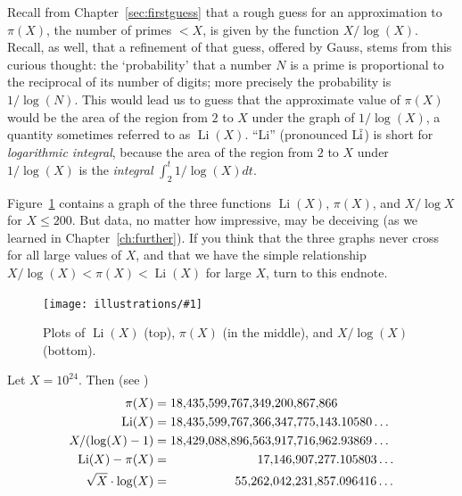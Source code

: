 \documentclass[openany]{book}
\DeclareMathOperator{\Li}{Li}
\newcommand{\ill}[3]{%
   \begin{figure}[H]%
   \vspace{-2ex}
   \centering%
   \texttt{[image: illustrations/\#1]}%
   \caption{#3}%
   \vspace{-2ex}
    \end{figure}}
\theoremstyle{plain}
\theoremstyle{definition}
\begin{document}
Recall from Chapter~\ref{sec:firstguess} that a rough guess for an approximation to
$\pi(X)$, the number of primes $< X$, is given by the function
$X/\log(X)$. Recall, as well, that a refinement of that guess, offered by Gauss, stems from this curious thought:  the `probability' that a number $N$ is a prime  is proportional to the reciprocal of its number of digits; more precisely the probability is $1/\log(N)$.  This would lead us to  guess that the approximate value of $\pi(X)$ would be
the area of the region from $2$ to $X$ under the graph of
$1/\log(X)$, a quantity sometimes referred to as $\Li(X)$.
``Li'' (pronounced L$\overline{\rm i}$) is short for {\em logarithmic integral},
because the area of the region from $2$ to $X$ under $1/\log(X)$
is the {\em integral} $\int_2^t 1/\log(X) dt$.




Figure~\ref{fig:threeplots} contains a graph of the three functions
$\Li(X)$, $\pi(X)$, and $X/\log X$ for $X\leq 200$.
But data, no matter how impressive, may be deceiving (as we learned in
Chapter~\ref{ch:further}). If you think
that  the three graphs  never cross for all large values of $X$,  and
that we have the simple relationship  $X/\log(X) < \pi(X) < \Li(X)$ for
large $X$, turn to this endnote.


\ill{three_plots}{.9}{Plots of $\Li(X)$ (top), $\pi(X)$ (in the middle), and $X/\log(X)$ (bottom).\label{fig:threeplots}}

Let $X=10^{24}$.  Then \label{pili_vals} (see )
\begin{align*}
  \pi(X) &= 18{,}435{,}599{,}767{,}349{,}200{,}867{,}866\\
  \Li(X) &= 18{,}435{,}599{,}767{,}366{,}347{,}775{,}143.10580\ldots \\
  X/(\log(X)-1)  &=
            18{,}429{,}088{,}896{,}563{,}917{,}716{,}962.93869\ldots\\
  \Li(X) - \pi(X) &= \hspace{7em}
     17{,}146{,}907{,}277.105803\ldots\\
  \sqrt{X}\cdot \log(X) &= \hspace{5.2em}
     55{,}262{,}042{,}231{,}857.096416 \ldots
\end{align*}
\end{document}
